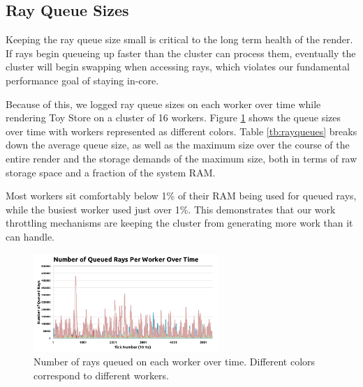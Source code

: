 \documentclass[a4paper,twoside]{article}
\begin{document}
\subsection{Ray Queue Sizes}
\label{queuesizes}

Keeping the ray queue size small is critical to the long term health of the
render. If rays begin queueing up faster than the cluster can process them,
eventually the cluster will begin swapping when accessing rays, which violates
our fundamental performance goal of staying in-core.

Because of this, we logged ray queue sizes on each worker over time while
rendering Toy Store on a cluster of 16 workers. Figure \ref{fig:queuesize}
shows the queue sizes over time with workers represented as different colors.
Table \ref{tb:rayqueues} breaks down the average queue size, as well as the
maximum size over the course of the entire render and the storage demands of the
maximum size, both in terms of raw storage space and a fraction of the system
RAM.

Most workers sit comfortably below 1\% of their RAM being used for queued rays,
while the busiest worker used just over 1\%. This demonstrates that our work
throttling mechanisms are keeping the cluster from generating more work than it
can handle.

\begin{figure}[h!]
    \centering
    \includegraphics[width=70mm]{figures/queuesize.png}
    \caption{Number of rays queued on each worker over time. Different colors correspond to different workers.}
    \label{fig:queuesize}
\end{figure}
\end{document}
